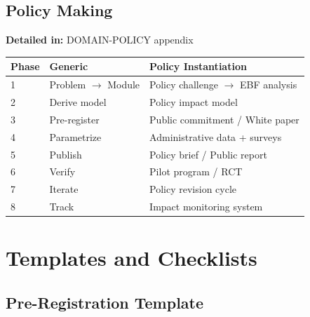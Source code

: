\subsection{Policy Making}

\textbf{Detailed in:} DOMAIN-POLICY appendix

\begin{center}
\small
\begin{tabular}{@{}lll@{}}
\toprule
\textbf{Phase} & \textbf{Generic} & \textbf{Policy Instantiation} \\
\midrule
1 & Problem $\to$ Module & Policy challenge $\to$ EBF analysis \\
2 & Derive model & Policy impact model \\
3 & Pre-register & Public commitment / White paper \\
4 & Parametrize & Administrative data + surveys \\
5 & Publish & Policy brief / Public report \\
6 & Verify & Pilot program / RCT \\
7 & Iterate & Policy revision cycle \\
8 & Track & Impact monitoring system \\
\bottomrule
\end{tabular}
\end{center}



\section{Templates and Checklists}
\label{sec:apply-templates}

\subsection{Pre-Registration Template}

